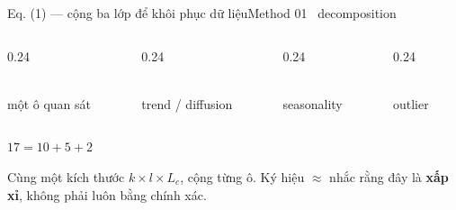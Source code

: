 \begin{frame}[shrink=30]{Eq. (1) --- cộng ba lớp để khôi phục dữ liệu}{Method 01 \textperiodcentered\ decomposition}
\vspace{4mm}
\begin{columns}[T,onlytextwidth]
\begin{column}{0.24\textwidth}
\begin{intuition}[Observed]
  \\một ô quan sát
\end{intuition}
\end{column}
\begin{column}{0.24\textwidth}
\begin{mathcard}
  \\trend / diffusion
\end{mathcard}
\end{column}
\begin{column}{0.24\textwidth}
\begin{mathcard}
  \\seasonality
\end{mathcard}
\end{column}
\begin{column}{0.24\textwidth}
\begin{caution}
  \\outlier
\end{caution}
\end{column}
\end{columns}
\vspace{4mm}
\centering
{\Large $17=10+5+2$ }
\vspace{3mm}
\begin{takeaway}
  Cùng một kích thước $k\times l\times L_c$, cộng từng ô. Ký hiệu $\approx$ nhắc rằng đây là \textbf{xấp xỉ}, không phải luôn bằng chính xác.
\end{takeaway}
\vspace{2mm}
\end{frame}

